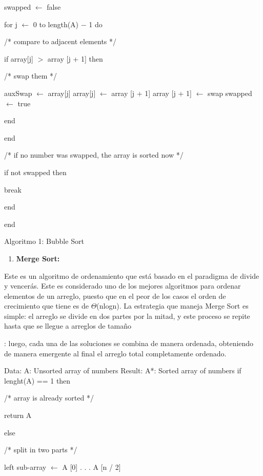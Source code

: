 \documentclass{article} %
\begin{document}
\noindent swapped $\mathrm{\leftarrow}$ false

\noindent for j $\mathrm{\leftarrow}$ 0 to length(A) $\mathrm{-}$ 1 do

\noindent /* compare to adjacent elements */

\noindent if array[j] $\mathrm{>}$ array [j + 1] then

\noindent /* swap them */

\noindent auxSwap $\mathrm{\leftarrow}$ array[j] array[j] $\mathrm{\leftarrow}$ array [j + 1] array [j + 1] $\mathrm{\leftarrow}$ swap swapped $\mathrm{\leftarrow}$ true

\noindent end

\noindent end

\noindent /* if no number was swapped, the array is sorted now */

\noindent if not swapped then

\noindent break

\noindent end

\noindent end

\noindent Algoritmo 1: Bubble Sort

\noindent 

\begin{enumerate}
\item  \textbf{Merge Sort:}
\end{enumerate}

Este es un algoritmo de ordenamiento que est\'{a} basado en el paradigma de divide y vencer\'{a}s. Este es considerado uno de los mejores algoritmos para ordenar elementos de un arreglo, puesto que en el peor de los casos el orden de crecimiento que tiene es de $\Theta$(nlogn). La estrategia que maneja Merge Sort es simple:  el arreglo se divide en dos partes por la mitad, y este proceso se repite hasta que se llegue a arreglos de tama\~{n}o

: luego, cada una de las soluciones se combina de manera ordenada, obteniendo de manera emergente al final el arreglo total completamente ordenado.

\noindent Data: A: Unsorted array of numbers Result:  A*: Sorted array of numbers if lenght(A) == 1 then

\noindent /* array is already sorted */

\noindent return A

\noindent else

\noindent /* split in two parts */

\noindent left sub-array $\mathrm{\leftarrow}$ A [0] . . . A [n / 2]
\end{document}
